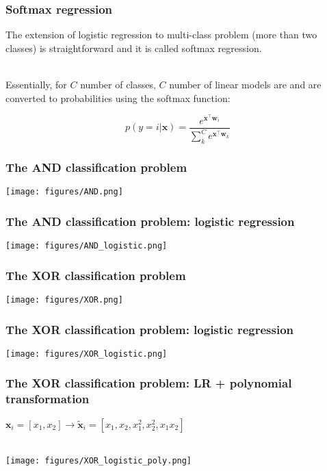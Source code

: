 \documentclass[notes]{beamer}          %
\begin{document}
\begin{frame}
\frametitle{Softmax regression}
The extension of logistic regression to multi-class problem (more than two classes) is straightforward and it is called softmax regression. \\~\

Essentially, for $C$ number of classes, $C$ number of linear models are and are converted to probabilities using the softmax function:

$$ p(y = i \vert \mathbf{x}) = \frac{e^{\mathbf{x}^\intercal\mathbf{w}_i}}{\sum_{k}^{C} e^{\mathbf{x}^\intercal\mathbf{w}_k}} $$
\end{frame}


\begin{frame}
\frametitle{The AND classification problem}
\begin{center}
\texttt{[image: figures/AND.png]} \\
\end{center}
\end{frame}


\begin{frame}
\frametitle{The AND classification problem: logistic regression}
\begin{center}
\texttt{[image: figures/AND\_logistic.png]} \\
\end{center}
\end{frame}



\begin{frame}
\frametitle{The XOR classification problem}
\begin{center}
\texttt{[image: figures/XOR.png]} \\
\end{center}
\end{frame}


\begin{frame}
\frametitle{The XOR classification problem: logistic regression}
\begin{center}
\texttt{[image: figures/XOR\_logistic.png]} \\
\end{center}
\end{frame}


\begin{frame}
\frametitle{The XOR classification problem: LR + polynomial transformation}
\begin{center}
$\mathbf{x}_i = [x_1, x_2] \rightarrow \tilde{\mathbf{x}}_i = [x_1, x_2, x_1^2, x_2^2, x_1 x_2]$ \\~\

\texttt{[image: figures/XOR\_logistic\_poly.png]} \\
\end{center}
\end{frame}
\end{document}
